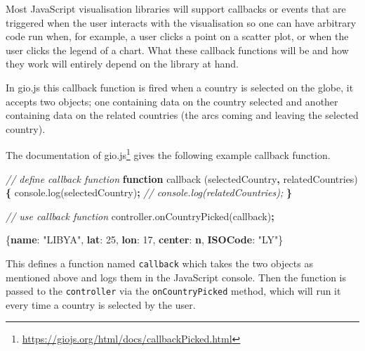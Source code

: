 \documentclass[10pt,]{krantz}
\makeatletter
\newenvironment{Shaded}{\begin{snugshade}}{\end{snugshade}}
\newcommand{\AttributeTok}[1]{\textcolor[rgb]{0.61,0.61,0.61}{#1}}
\newcommand{\CommentTok}[1]{\textcolor[rgb]{0.37,0.37,0.37}{\textit{#1}}}
\newcommand{\DecValTok}[1]{\textcolor[rgb]{0.06,0.06,0.06}{#1}}
\newcommand{\ErrorTok}[1]{\textcolor[rgb]{0.14,0.14,0.14}{\textbf{#1}}}
\newcommand{\FunctionTok}[1]{\textcolor[rgb]{0,0,0}{#1}}
\newcommand{\KeywordTok}[1]{\textcolor[rgb]{0.27,0.27,0.27}{\textbf{#1}}}
\newcommand{\NormalTok}[1]{#1}
\newcommand{\OperatorTok}[1]{\textcolor[rgb]{0.43,0.43,0.43}{\textbf{#1}}}
\newcommand{\StringTok}[1]{\textcolor[rgb]{0.5,0.5,0.5}{#1}}
\newcommand{\VariableTok}[1]{\textcolor[rgb]{0,0,0}{#1}}
\renewcommand{\href}[2]{#2\footnote{\url{#1}}}
\newenvironment{kframe}{%
\medskip{}
\setlength{\fboxsep}{.8em}
 \def\at@end@of@kframe{}%
 \ifinner\ifhmode%
  \def\at@end@of@kframe{\end{minipage}}%
  \begin{minipage}{\columnwidth}%
 \fi\fi%
 \def\FrameCommand##1{\hskip\@totalleftmargin \hskip-\fboxsep
 \colorbox{shadecolor}{##1}\hskip-\fboxsep
     \hskip-\linewidth \hskip-\@totalleftmargin \hskip\columnwidth}%
 \MakeFramed {\advance\hsize-\width
   \@totalleftmargin\z@ \linewidth\hsize
   \@setminipage}}%
 {\par\unskip\endMakeFramed%
 \at@end@of@kframe}
\renewenvironment{Shaded}{\begin{kframe}}{\end{kframe}}
\makeatother
\begin{document}
Most JavaScript visualisation libraries will support callbacks or events that are triggered when the user interacts with the visualisation so one can have arbitrary code run when, for example, a user clicks a point on a scatter plot, or when the user clicks the legend of a chart. What these callback functions will be and how they work will entirely depend on the library at hand.

In gio.js this callback function is fired when a country is selected on the globe, it accepts two objects; one containing data on the country selected and another containing data on the related countries (the arcs coming and leaving the selected country).

The \href{https://giojs.org/html/docs/callbackPicked.html}{documentation of gio.js} gives the following example callback function.

\begin{Shaded}
\begin{Highlighting}[]
\CommentTok{// define callback function}
\KeywordTok{function} \AttributeTok{callback}\NormalTok{ (selectedCountry}\OperatorTok{,}\NormalTok{ relatedCountries) }\OperatorTok{\{}
  \VariableTok{console}\NormalTok{.}\AttributeTok{log}\NormalTok{(selectedCountry)}\OperatorTok{;}
  \CommentTok{// console.log(relatedCountries);}
\OperatorTok{\}}

\CommentTok{// use callback function}
\VariableTok{controller}\NormalTok{.}\AttributeTok{onCountryPicked}\NormalTok{(callback)}\OperatorTok{;}
\end{Highlighting}
\end{Shaded}

\begin{Shaded}
\begin{Highlighting}[]
\FunctionTok{\{}\ErrorTok{name}\FunctionTok{:} \StringTok{"LIBYA"}\FunctionTok{,} \ErrorTok{lat}\FunctionTok{:} \DecValTok{25}\FunctionTok{,} \ErrorTok{lon}\FunctionTok{:} \DecValTok{17}\FunctionTok{,} \ErrorTok{center}\FunctionTok{:} \ErrorTok{n}\FunctionTok{,} \ErrorTok{ISOCode}\FunctionTok{:} \StringTok{"LY"}\FunctionTok{\}}
\end{Highlighting}
\end{Shaded}

This defines a function named \texttt{callback} which takes the two objects as mentioned above and logs them in the JavaScript console. Then the function is passed to the \texttt{controller} via the \texttt{onCountryPicked} method, which will run it every time a country is selected by the user.
\end{document}
